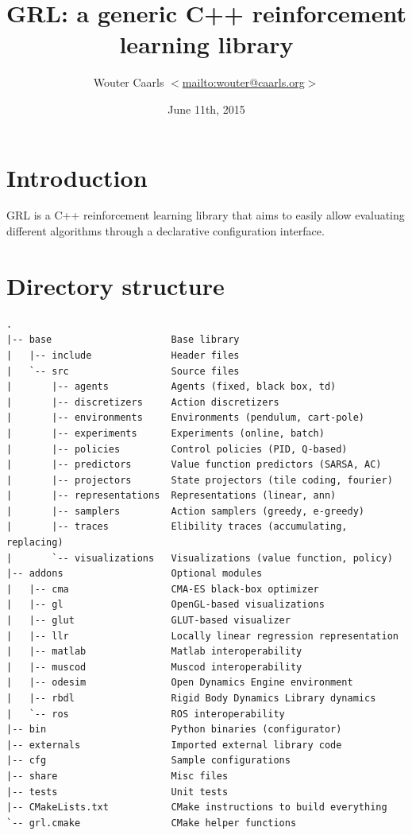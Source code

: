 \documentclass{article}
\title{GRL: a generic C++ reinforcement learning library}
\author{Wouter Caarls $<$\url{mailto:wouter@caarls.org}$>$}
\date{June 11th, 2015}
\begin{document}
\maketitle

\section{Introduction}

GRL is a C++ reinforcement learning library that aims to easily allow
evaluating different algorithms through a declarative configuration
interface.

\section{Directory structure}

\begin{verbatim}
.
|-- base                     Base library
|   |-- include              Header files
|   `-- src                  Source files
|       |-- agents           Agents (fixed, black box, td)
|       |-- discretizers     Action discretizers
|       |-- environments     Environments (pendulum, cart-pole)
|       |-- experiments      Experiments (online, batch)
|       |-- policies         Control policies (PID, Q-based)
|       |-- predictors       Value function predictors (SARSA, AC)
|       |-- projectors       State projectors (tile coding, fourier)
|       |-- representations  Representations (linear, ann) 
|       |-- samplers         Action samplers (greedy, e-greedy)
|       |-- traces           Elibility traces (accumulating, replacing)
|       `-- visualizations   Visualizations (value function, policy)
|-- addons                   Optional modules
|   |-- cma                  CMA-ES black-box optimizer
|   |-- gl                   OpenGL-based visualizations
|   |-- glut                 GLUT-based visualizer
|   |-- llr                  Locally linear regression representation
|   |-- matlab               Matlab interoperability
|   |-- muscod               Muscod interoperability
|   |-- odesim               Open Dynamics Engine environment
|   |-- rbdl                 Rigid Body Dynamics Library dynamics
|   `-- ros                  ROS interoperability
|-- bin                      Python binaries (configurator)
|-- externals                Imported external library code
|-- cfg                      Sample configurations
|-- share                    Misc files
|-- tests                    Unit tests
|-- CMakeLists.txt           CMake instructions to build everything
`-- grl.cmake                CMake helper functions
\end{verbatim}
\end{document}
